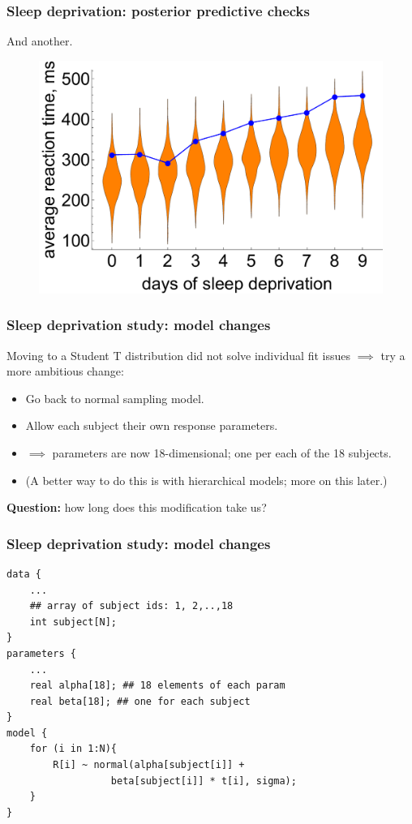 \documentclass[handout]{beamer}
\begin{document}
\begin{frame}
	\frametitle{Sleep deprivation: posterior predictive checks}
	And another.
	
	\begin{figure}[ht]
		\centerline{\includegraphics[width=1\textwidth]{./Figures/lec6_sleepPPC3.pdf}}
	\end{figure}
	
\end{frame}

\begin{frame}
	\frametitle{Sleep deprivation study: model changes}
	 Moving to a Student T distribution did not solve individual fit issues $\implies$ try a more ambitious change:
	
	\begin{itemize}
		\item<3-> Go back to normal sampling model.
		\item<4-> Allow each subject their own response parameters.
		\item<5-> $\implies$ parameters are now 18-dimensional; one per each of the 18 subjects.
		\item<6-> (A better way to do this is with hierarchical models; more on this later.)
	\end{itemize}
	
	\vspace{0.2cm}
	
	\textbf{Question:} how long does this modification take us?

	
\end{frame}

\begin{frame}[fragile]
	\frametitle{Sleep deprivation study: model changes}
		\begin{verbatim}
data {
    ...
    ## array of subject ids: 1, 2,..,18
    int subject[N];
}
parameters {
    ...
    real alpha[18]; ## 18 elements of each param
    real beta[18]; ## one for each subject
} 
model {
    for (i in 1:N){
        R[i] ~ normal(alpha[subject[i]] + 
                  beta[subject[i]] * t[i], sigma);
    }
}
\end{verbatim}
\end{frame}
\end{document}
